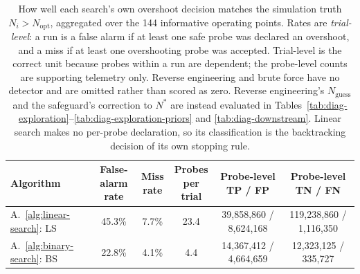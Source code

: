 \begin{table}[ht]
\centering
\small
\caption{How well each search's own overshoot decision matches the simulation truth $N_i > N_{\mathrm{opt}}$, aggregated over the 144 informative operating points. Rates are \emph{trial-level}: a run is a false alarm if at least one safe probe was declared an overshoot, and a miss if at least one overshooting probe was accepted. Trial-level is the correct unit because probes within a run are dependent; the probe-level counts are supporting telemetry only. Reverse engineering and brute force have no detector and are omitted rather than scored as zero. Reverse engineering's $N_{\mathrm{guess}}$ and the safeguard's correction to $N^*$ are instead evaluated in Tables~\ref{tab:diag-exploration}--\ref{tab:diag-exploration-priors} and \ref{tab:diag-downstream}. Linear search makes no per-probe declaration, so its classification is the backtracking decision of its own stopping rule.}
\label{tab:diag-detector}
\setlength{\tabcolsep}{4pt}
\begin{tabular}{lccccc}
\toprule
Algorithm
& \makecell{False-alarm \\ rate}
& \makecell{Miss \\ rate}
& \makecell{Probes \\ per trial}
& \makecell{Probe-level \\ TP / FP}
& \makecell{Probe-level \\ TN / FN} \\
\midrule
A.~\ref{alg:linear-search}: LS
& 45.3\%
& 7.7\%
& 23.4
& 39{,}858{,}860 / 8{,}624{,}168
& 119{,}238{,}860 / 1{,}116{,}350 \\
A.~\ref{alg:binary-search}: BS
& 22.8\%
& 4.1\%
& 4.4
& 14{,}367{,}412 / 4{,}664{,}659
& 12{,}323{,}125 / 335{,}727 \\
\bottomrule
\end{tabular}
\end{table}
